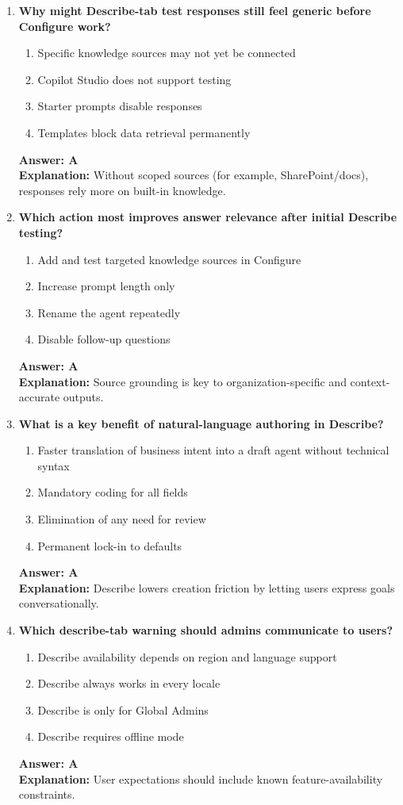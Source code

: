 \documentclass[10pt]{article}
\begin{document}
\begin{enumerate}[leftmargin=*]
\item \textbf{Why might Describe-tab test responses still feel generic before Configure work?}
\begin{enumerate}[label=\Alph*.]
  \item Specific knowledge sources may not yet be connected
  \item Copilot Studio does not support testing
  \item Starter prompts disable responses
  \item Templates block data retrieval permanently
\end{enumerate}
\textbf{Answer: A}\\
\textbf{Explanation:} Without scoped sources (for example, SharePoint/docs), responses rely more on built-in knowledge.

\item \textbf{Which action most improves answer relevance after initial Describe testing?}
\begin{enumerate}[label=\Alph*.]
  \item Add and test targeted knowledge sources in Configure
  \item Increase prompt length only
  \item Rename the agent repeatedly
  \item Disable follow-up questions
\end{enumerate}
\textbf{Answer: A}\\
\textbf{Explanation:} Source grounding is key to organization-specific and context-accurate outputs.

\item \textbf{What is a key benefit of natural-language authoring in Describe?}
\begin{enumerate}[label=\Alph*.]
  \item Faster translation of business intent into a draft agent without technical syntax
  \item Mandatory coding for all fields
  \item Elimination of any need for review
  \item Permanent lock-in to defaults
\end{enumerate}
\textbf{Answer: A}\\
\textbf{Explanation:} Describe lowers creation friction by letting users express goals conversationally.

\item \textbf{Which describe-tab warning should admins communicate to users?}
\begin{enumerate}[label=\Alph*.]
  \item Describe availability depends on region and language support
  \item Describe always works in every locale
  \item Describe is only for Global Admins
  \item Describe requires offline mode
\end{enumerate}
\textbf{Answer: A}\\
\textbf{Explanation:} User expectations should include known feature-availability constraints.


\end{enumerate}
\end{document}
